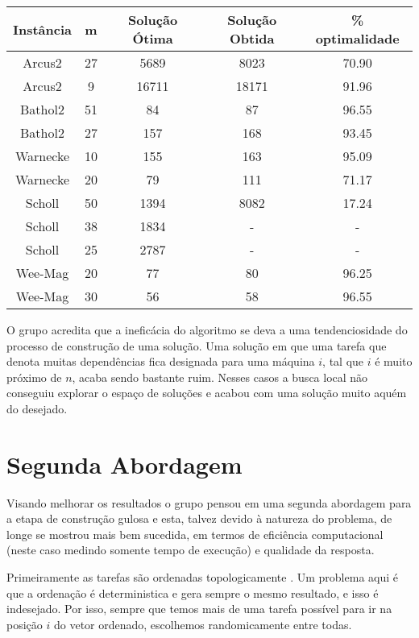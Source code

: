 \documentclass{report}
\begin{document}
\begin{table}[htbp]
 \begin{tabular}{|c|c|c|c|c|}
  \hline
  \textbf{Instância} & \textbf{m} & \textbf{Solução Ótima} & \textbf{Solução Obtida} & \% optimalidade \\
  \hline
  Arcus2 & 27 & 5689 & 8023 & 70.90 \\
  \hline
  Arcus2 & 9 & 16711 & 18171 & 91.96 \\
  \hline
  Bathol2 & 51 & 84 & 87 & 96.55 \\
  \hline
  Bathol2 & 27 & 157 & 168 & 93.45 \\
  \hline
  Warnecke & 10 & 155 & 163 & 95.09 \\
  \hline
  Warnecke & 20 & 79 & 111 & 71.17 \\
  \hline
  Scholl & 50 & 1394 & 8082 & 17.24 \\
  \hline
  Scholl & 38 & 1834 & - & - \\
  \hline
  Scholl & 25 & 2787 & - & - \\
  \hline
  Wee-Mag & 20 & 77 & 80 & 96.25 \\
  \hline
  Wee-Mag & 30 & 56 & 58 & 96.55 \\
  \hline
 \end{tabular}
\end{table}

O grupo acredita que a ineficácia do algoritmo se deva a uma tendenciosidade do
processo de construção de uma solução. Uma solução em que uma tarefa que denota
muitas dependências fica designada para uma máquina $i$, tal que $i$ é muito
próximo de $n$, acaba sendo bastante ruim. Nesses casos a busca local não
conseguiu explorar o espaço de soluções e acabou com uma solução muito aquém
do desejado.

\section{Segunda Abordagem}

Visando melhorar os resultados o grupo pensou em uma segunda abordagem para a
etapa de construção gulosa e esta, talvez devido à natureza do problema,
de longe se mostrou  mais bem sucedida, em termos de
eficiência computacional (neste caso medindo
somente tempo de execução) e qualidade da resposta.

Primeiramente as tarefas são ordenadas topologicamente \cite{top}.
Um problema aqui é que a ordenação é deterministica e gera
sempre o mesmo resultado, e isso é indesejado. Por isso, sempre que temos mais
de uma tarefa possível para ir na
posição $i$ do vetor ordenado, escolhemos randomicamente entre todas.
\end{document}
